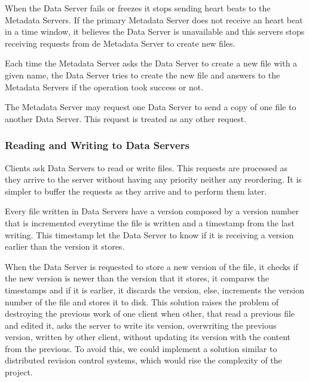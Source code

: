 When the Data Server fails or freezes it stops sending heart beats to
the Metadata Servers. If the primary Metadata Server does not receive an
heart beat in a time window, it believes the Data Server is unavailable
and this servers stops receiving requests from de Metadata Server to
create new files.

Each time the Metadata Server asks the Data Server to create a new file
with a given name, the Data Server tries to create the new file and answers
to the Metadata Servers if the operation took success or not.

The Metadata Server may request one Data Server to send a copy of one file
to another Data Server. This request is treated as any other request.

\subsubsection{Reading and Writing to Data Servers}

Clients ask Data Servers to read or write files. This requests are
processed as they arrive to the server without having any priority neither
any reordering. It is simpler to buffer the requests as they arrive and to
perform them later.

Every file written in Data Servers have a version composed by a version
number that is incremented everytime the file is written and a timestamp
from the last writing. This timestamp let the Data Server to know if it is
receiving a version earlier than the version it stores.

When the Data Server is requested to store a new version of the file, it
checks if the new version is newer than the version that it stores, it
compares the timestamps and if it is earlier, it discards the version, else,
increments the version number of the file and stores it to disk.
This solution raises the problem of destroying the previous work of one
client when other, that read a previous file and edited it, asks the server
to write its version, overwriting the previous version, written by other
client, without updating its version with the content from the previous. To
avoid this, we could implement a solution similar to distributed revision
control systems, which would rise the complexity of the project.